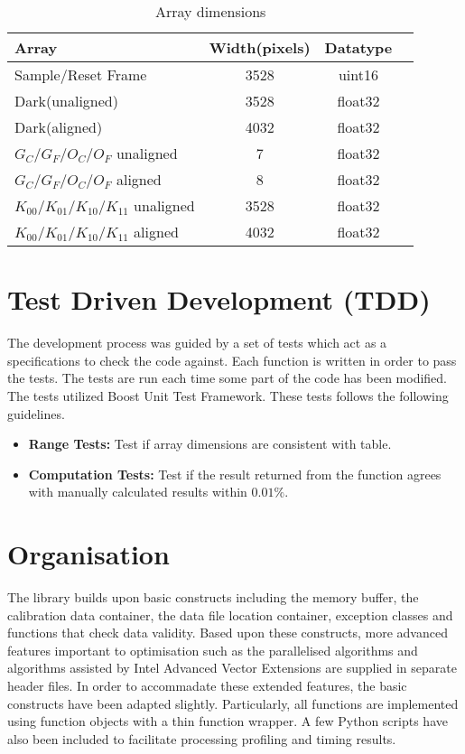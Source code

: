 \documentclass[journal]{IEEEtran}
\begin{document}
\begin{table}[h]

\label{array_dims}
\centering
\begin{tabular}{l c c c}
\hline
Array 					& Width(pixels) & Datatype\\
\hline\hline
Sample/Reset Frame       				& 3528 & uint16     \\
\hline
Dark(unaligned)					 	& 3528 & float32     \\
\hline
Dark(aligned)				 		& 4032 & float32     \\
\hline
$G_C/G_F/O_C/O_F$ unaligned 				& 7    & float32    \\
\hline
$G_C/G_F/O_C/O_F$ aligned 				& 8    & float32     \\
\hline
$K_{00}/K_{01}/K_{10}/K_{11}$ unaligned 	& 3528 & float32     \\
\hline
$K_{00}/K_{01}/K_{10}/K_{11}$ aligned 		& 4032 & float32     \\
\hline

\end{tabular}
\caption{Array dimensions}
\end{table}



\section{Test Driven Development (TDD)} %

The development process was guided by a set of tests which act as a specifications to check the code against. Each function is written in order to pass the tests. The tests are run each time some part of the code has been modified. The tests utilized Boost Unit Test Framework. These tests follows the following guidelines.
\begin{itemize}
 \item \textbf{Range Tests:} Test if array dimensions are consistent with table.
 \item \textbf{Computation Tests:} Test if the result returned from the function agrees with manually calculated results within $0.01\%$.	
\end{itemize}

\section{Organisation}	%
The library builds upon basic constructs including the memory buffer, the calibration data container, the data file location container, exception classes and functions that check data validity. Based upon these constructs, more advanced features important to optimisation such as the parallelised algorithms and algorithms assisted by Intel Advanced Vector Extensions are supplied in separate header files. In order to accommadate these extended features, the basic constructs have been adapted slightly. Particularly, all functions are implemented using function objects with a thin function wrapper. A few Python scripts have also been included to facilitate processing profiling and timing results.
\end{document}
